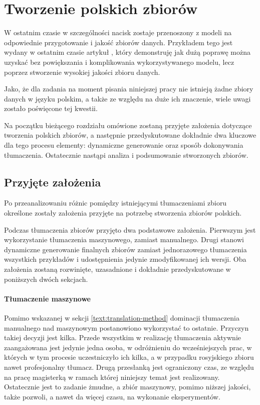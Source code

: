 \chapter{Tworzenie polskich zbiorów}
W ostatnim czasie w szczególności nacisk zostaje przenoszony z modeli na odpowiednie przygotowanie i jakość zbiorów danych. Przykładem tego jest wydany w ostatnim czasie artykuł  \cite{Gunasekar2023}, który demonstruję jak dużą poprawę można uzyskać bez powiększania i komplikowania wykorzystywanego modelu, lecz poprzez stworzenie wysokiej jakości zbioru danych.

Jako, że dla zadania  na moment pisania niniejszej pracy nie istnieją żadne zbiory danych w języku polskim, a także ze względu na duże ich znaczenie, wiele uwagi zostało poświęcone tej kwestii. 

Na początku bieżącego rozdziału omówione zostaną przyjęte założenia dotyczące tworzenia polskich zbiorów, a następnie przedyskutowane dokładnie dwa kluczowe dla tego procesu elementy: dynamiczne generowanie oraz sposób dokonywania tłumaczenia. Ostatecznie nastąpi analiza i podsumowanie stworzonych zbiorów.

\section{Przyjęte założenia}
Po przeanalizowaniu różnic pomiędzy istniejącymi tłumaczeniami zbioru  określone zostały założenia przyjęte na potrzebę stworzenia zbiorów polskich.

Podczas tłumaczenia zbiorów przyjęto dwa podstawowe założenia. Pierwszym jest wykorzystanie tłumaczenia maszynowego, zamiast manualnego. Drugi stanowi dynamiczne generowanie finalnych zbiorów zamiast jednorazowego tłumaczenia wszystkich przykładów i udostępnienia jedynie zmodyfikowanej ich wersji. Oba założenia zostaną rozwinięte, uzasadnione i dokładnie przedyskutowane w poniższych dwóch sekcjach.

\subsubsection{Tłumaczenie maszynowe}
Pomimo wskazanej w sekcji \ref{text:translation-method} dominacji tłumaczenia manualnego nad maszynowym postanowiono wykorzystać to ostatnie. Przyczyn takiej decyzji jest kilka. Przede wszystkim w realizację tłumaczenia aktywnie zaangażowana jest jedynie jedna osoba, w odróżnieniu do wcześniejszych prac, w których w tym procesie uczestniczyło ich kilka, a w przypadku rosyjskiego zbioru nawet profesjonalny tłumacz. Drugą przesłanką jest ograniczony czas, ze względu na pracę magisterką w ramach której niniejszy temat jest realizowany. Ostatecznie jest to zadanie żmudne, a zbiór maszynowy, pomimo niższej jakości, także pozwoli, a nawet da więcej czasu, na wykonanie eksperymentów.

